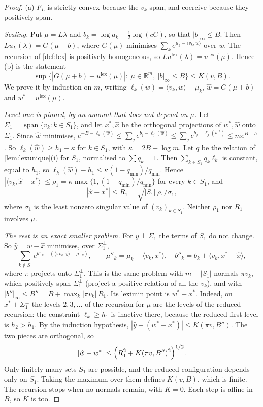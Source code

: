 \documentclass[11pt]{article}
\theoremstyle{definition}\newtheorem{definition}[theorem]{Definition}\newtheorem{remark}[theorem]{Remark}\newtheorem{example}[theorem]{Example}\newtheorem{problem}[theorem]{Open problem}\crefname{problem}{Problem}{Problems}
\newcommand{\R}{\mathbb R}
\begin{document}
\begin{proof}
(a) $F_L$ is strictly convex because the $v_k$ span, and coercive because they positively span.

\emph{Scaling.} Put $\mu=L\lambda$ and $b_k=\log a_k-\tfrac12\log(cC)$, so that $|b|_\infty\le B$. Then $Lu_L(\lambda)=G(\mu+b)$, where $G(\mu)$ minimises $\sum_ke^{\mu_k-\langle v_k,w\rangle}$ over $w$. The recursion of \cref{def:lex} is positively homogeneous, so $Lu^{\mathrm{lex}}(\lambda)=u^{\mathrm{lex}}(\mu)$. Hence (b) is the statement
\[
\sup\{|G(\mu+b)-u^{\mathrm{lex}}(\mu)|:\ \mu\in\R^m,\ |b|_\infty\le B\}\le K(v,B).
\]
We prove it by induction on $m$, writing $\ell_k(w)=\langle v_k,w\rangle-\mu_k$, $\hat w=G(\mu+b)$ and $w^*=u^{\mathrm{lex}}(\mu)$.

\emph{Level one is pinned, by an amount that does not depend on $\mu$.} Let $\Sigma_1=\operatorname{span}\{v_k:k\in S_1\}$, and let $x^*,\hat x$ be the orthogonal projections of $w^*,\hat w$ onto $\Sigma_1$. Since $\hat w$ minimises, $e^{-B-\ell_k(\hat w)}\le\sum_je^{b_j-\ell_j(\hat w)}\le\sum_je^{b_j-\ell_j(w^*)}\le me^{B-h_1}$. So $\ell_k(\hat w)\ge h_1-\kappa$ for $k\in S_1$, with $\kappa=2B+\log m$. Let $q$ be the relation of \cref{lem:lexunique}(i) for $S_1$, normalised to $\sum q_k=1$. Then $\sum_{k\in S_1}q_k\ell_k$ is constant, equal to $h_1$, so $\ell_k(\hat w)-h_1\le\kappa(1-q_{\min})/q_{\min}$. Hence $|\langle v_k,\hat x-x^*\rangle|\le\rho_1=\kappa\max\{1,(1-q_{\min})/q_{\min}\}$ for every $k\in S_1$, and
\[
|\hat x-x^*|\le R_1=\sqrt{|S_1|}\,\rho_1/\sigma_1 ,
\]
where $\sigma_1$ is the least nonzero singular value of $(v_k)_{k\in S_1}$. Neither $\rho_1$ nor $R_1$ involves $\mu$.

\emph{The rest is an exact smaller problem.} For $y\perp\Sigma_1$ the terms of $S_1$ do not change. So $\hat y=\hat w-\hat x$ minimises, over $\Sigma_1^\perp$,
\[
\sum_{k\notin S_1}e^{b''_k-(\langle\pi v_k,y\rangle-\mu''_k)},\qquad \mu''_k=\mu_k-\langle v_k,x^*\rangle,\quad b''_k=b_k+\langle v_k,x^*-\hat x\rangle ,
\]
where $\pi$ projects onto $\Sigma_1^\perp$. This is the same problem with $m-|S_1|$ normals $\pi v_k$, which positively span $\Sigma_1^\perp$ (project a positive relation of all the $v_k$), and with $|b''|_\infty\le B''=B+\max_k|\pi v_k|\,R_1$. Its leximin point is $w^*-x^*$. Indeed, on $x^*+\Sigma_1^\perp$ the levels $2,3,\dots$ of the recursion for $\mu$ are the levels of the reduced recursion: the constraint $\ell_k\ge h_1$ is inactive there, because the reduced first level is $h_2>h_1$. By the induction hypothesis, $|\hat y-(w^*-x^*)|\le K(\pi v,B'')$. The two pieces are orthogonal, so
\[
|\hat w-w^*|\le\Bigl(R_1^2+K(\pi v,B'')^2\Bigr)^{1/2}.
\]
Only finitely many sets $S_1$ are possible, and the reduced configuration depends only on $S_1$. Taking the maximum over them defines $K(v,B)$, which is finite. The recursion stops when no normals remain, with $K=0$. Each step is affine in $B$, so $K$ is too.


\end{proof}
\end{document}

